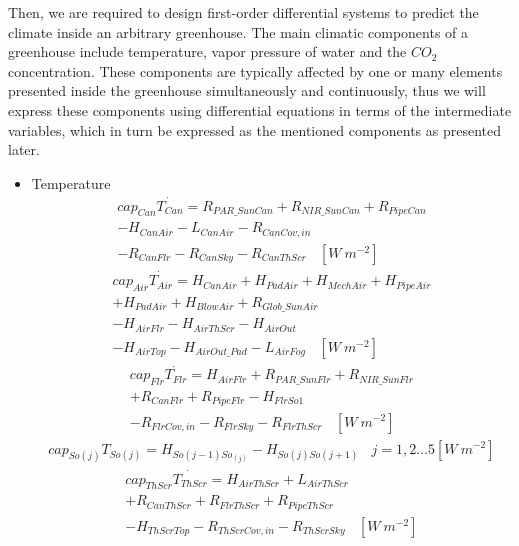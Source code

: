 \documentclass[a4paper]{article}
\numberwithin{equation}{section}
\begin{document}
Then, we are required to design first-order differential systems to predict the climate inside an arbitrary greenhouse.
The main climatic components of a greenhouse include temperature, vapor pressure of water and the \( CO_2 \) concentration.
These components are typically affected by one or many elements presented inside the greenhouse simultaneously and continuously, thus we will express these components using differential equations in terms of the intermediate variables, which in turn be expressed as the mentioned components as presented later.
\begin{itemize}
  \item Temperature
        \begin{multline*}
          cap_{Can}\dot{T_{Can}} = {}R_{PAR\_SunCan} + R_{NIR\_SunCan} + R_{PipeCan} \\
          - H_{CanAir} - L_{CanAir} - R_{CanCov,in} \\
          - R_{CanFlr} - R_{CanSky} - R_{CanThScr} ~~~~ [W\ m^{-2}]
        \end{multline*}
        \begin{multline*}
          cap_{Air}\dot{T_{Air}} = H_{CanAir} + H_{PadAir} + H_{MechAir} + H_{PipeAir} \\
          + H_{PadAir} + H_{BlowAir} + R_{Glob\_SunAir} \\
          - H_{AirFlr} - H_{AirThScr} - H_{AirOut} \\
          - H_{AirTop} - H_{AirOut\_Pad} - L_{AirFog} ~~~~ [W\ m^{-2}]
        \end{multline*}
        \begin{multline*}
          cap_{Flr}\dot{T_{Flr}} = H_{AirFlr} + R_{PAR\_SunFlr} + R_{NIR\_SunFlr} \\
          + R_{CanFlr} + R_{PipeFlr} - H_{FlrSo1} \\
          - R_{FlrCov,in} - R_{FlrSky} - R_{FlrThScr} ~~~~ [W\ m^{-2}]
        \end{multline*}
        \begin{multline*}
          cap_{So(j)}T_{So(j)} = H_{So(j-1)So_{(j)}} - H_{So(j)So(j+1)} ~~~~ j=1,2\dots5 [W\ m^{-2}]
        \end{multline*}
        \begin{multline*}
          cap_{ThScr}\dot{T_{ThScr}} = H_{AirThScr} + L_{AirThScr} \\
          + R_{CanThScr} + R_{FlrThScr} + R_{PipeThScr} \\
          - H_{ThScrTop} - R_{ThScrCov,in} - R_{ThScrSky} ~~~~ [W\ m^{-2}]

\end{multline*}
\end{itemize}
\end{document}
